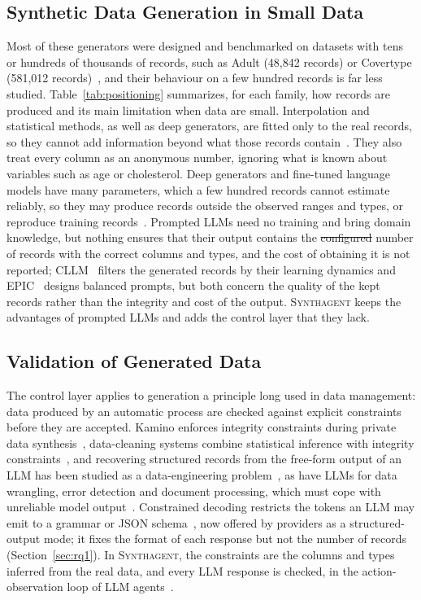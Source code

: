 \documentclass[conference]{IEEEtran}
\newcommand{\system}{\textsc{Synthagent}\xspace}
\providecommand{\DIFaddtex}[1]{{\protect\color{blue}\uwave{#1}}} %
\providecommand{\DIFdeltex}[1]{{\protect\color{red}\sout{#1}}}                      %
\providecommand{\DIFaddbegin}{} %
\providecommand{\DIFaddend}{} %
\providecommand{\DIFdelbegin}{} %
\providecommand{\DIFdelend}{} %
\providecommand{\DIFadd}[1]{\texorpdfstring{\DIFaddtex{#1}}{#1}} %
\providecommand{\DIFdel}[1]{\texorpdfstring{\DIFdeltex{#1}}{}} %
\newcommand{\DIFscaledelfig}{0.5}
\newlength{\DIFdelgraphicswidth} %
\newlength{\DIFdelgraphicsheight} %
\newcommand{\DIFaddincludegraphics}[2][]{{\color{blue}\fbox{\DIFOincludegraphics[#1]{#2}}}} %
\newcommand{\DIFdelincludegraphics}[2][]{%
\sbox{\DIFdelgraphicsbox}{\DIFOincludegraphics[#1]{#2}}%
\settoboxwidth{\DIFdelgraphicswidth}{\DIFdelgraphicsbox} %
\settoboxtotalheight{\DIFdelgraphicsheight}{\DIFdelgraphicsbox} %
\scalebox{\DIFscaledelfig}{%
\parbox[b]{\DIFdelgraphicswidth}{\usebox{\DIFdelgraphicsbox}\\[-\baselineskip] \rule{\DIFdelgraphicswidth}{0em}}\llap{\resizebox{\DIFdelgraphicswidth}{\DIFdelgraphicsheight}{%
\setlength{\unitlength}{\DIFdelgraphicswidth}%
\begin{picture}(1,1)%
\thicklines\linethickness{2pt} %
{\color[rgb]{1,0,0}\put(0,0){\framebox(1,1){}}}%
{\color[rgb]{1,0,0}\put(0,0){\line( 1,1){1}}}%
{\color[rgb]{1,0,0}\put(0,1){\line(1,-1){1}}}%
\end{picture}%
}\hspace*{3pt}}} %
} %
\DeclareRobustCommand{\DIFaddbegin}{\DIFOaddbegin \let\includegraphics\DIFaddincludegraphics} %
\DeclareRobustCommand{\DIFaddend}{\DIFOaddend \let\includegraphics\DIFOincludegraphics} %
\DeclareRobustCommand{\DIFdelbegin}{\DIFOdelbegin \let\includegraphics\DIFdelincludegraphics} %
\DeclareRobustCommand{\DIFdelend}{\DIFOaddend \let\includegraphics\DIFOincludegraphics} %
\begin{document}
\subsection{Synthetic Data Generation in Small Data}
Most of these generators were designed and benchmarked on datasets with tens or hundreds of thousands of records, such as Adult (48,842 records) or Covertype (581,012 records)~\cite{xu2019ctgan}, and their behaviour on a few hundred records is far less studied. Table~\ref{tab:positioning} summarizes, for each family, how records are produced and its main limitation when data are small. Interpolation and statistical methods, as well as deep generators, are fitted only to the real records, so they cannot add information beyond what those records contain~\cite[Sec.~2.8]{cover2006elements}. They also treat every column as an anonymous number, ignoring what is known about variables such as age or cholesterol. Deep generators and fine-tuned language models have many parameters, which a few hundred records cannot estimate reliably, so they may produce records outside the observed ranges and types, or reproduce training records~\cite{hyeong2022tabularmia}. Prompted LLMs need no training and bring domain knowledge, but nothing ensures that their output contains the \DIFdelbegin \DIFdel{configured }\DIFdelend \DIFaddbegin \DIFadd{requested }\DIFaddend number of records with the correct columns and types, and the cost of obtaining it is not reported; CLLM~\cite{seedat2024cllm} filters the generated records by their learning dynamics and EPIC~\cite{kim2024epic} designs balanced prompts, but both concern the quality of the kept records rather than the integrity and cost of the output. \system keeps the advantages of prompted LLMs and adds the control layer that they lack.

\subsection{Validation of Generated Data}
The control layer applies to generation a principle long used in data management: data produced by an automatic process are checked against explicit constraints before they are accepted. Kamino enforces integrity constraints during private data synthesis~\cite{ge2021kamino}, data-cleaning systems combine statistical inference with integrity constraints~\cite{chu2013holistic,qin2024bclean}, and recovering structured records from the free-form output of an LLM has been studied as a data-engineering problem~\cite{rorseth2026recovering}, as have LLMs for data wrangling, error detection and document processing, which must cope with unreliable model output~\cite{narayan2022wrangle,ni2025zeroed,shankar2025docetl}. Constrained decoding restricts the tokens an LLM may emit to a grammar or JSON schema~\cite{willard2023outlines,geng2023grammar}, now offered by providers as a structured-output mode; it fixes the format of each response but not the number of records (Section~\ref{sec:rq1}). In \system, the constraints are the columns and types inferred from the real data, and every LLM response is checked, in the action-observation loop of LLM agents~\cite{yao2023react,wang2024agentsurvey}.
\end{document}
